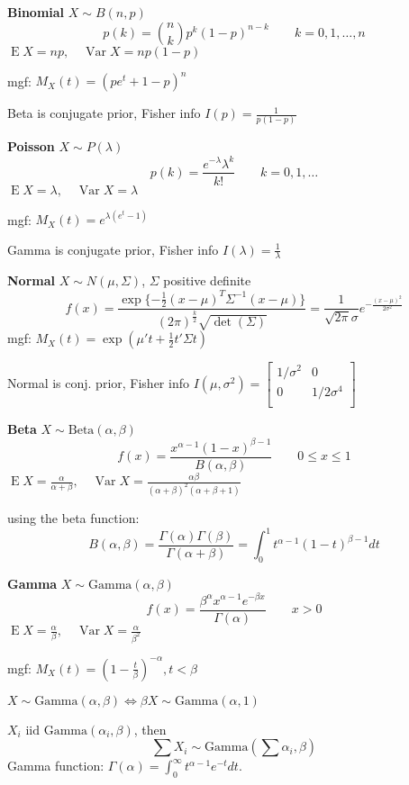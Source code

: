 \documentclass[10pt, twocolumn]{article}
\newcommand{\iid}{\text{ iid }}
\newcommand{\Expect}{\operatorname{E}}
\newcommand{\Var}{\operatorname{Var}}
\begin{document}
\textbf{Binomial}
$X \sim B(n, p)$
\[
    p(k) = \binom{n}{k} p^k (1-p)^{n-k}
    \qquad k = 0, 1, \dots, n
\]
$\Expect X = np, \quad \Var X = np(1-p)$

mgf: $M_X (t) = (pe^t + 1 - p)^n$

Beta is conjugate prior, Fisher info $I(p) = \frac{1}{p(1 - p)}$

\textbf{Poisson}
$X \sim P(\lambda)$
\[
    p(k) = \frac{e^{-\lambda} \lambda^k}{k!}
    \qquad k = 0, 1, \dots
\]
$\Expect X = \lambda, \quad \Var X = \lambda$

mgf: $M_X (t) = e^{\lambda (e^t -1)}$

Gamma is conjugate prior, Fisher info $I(\lambda) = \frac{1}{\lambda}$

\textbf{Normal}
$X \sim N(\mu, \Sigma)$, $\Sigma$ positive definite
\[
    f(x) = \frac{\exp\{ - \frac{1}{2}(x - \mu)^T \Sigma^{-1} (x - \mu) \}}
        {(2\pi)^{\frac{k}{2}} \sqrt{\det(\Sigma)}}
        = \frac{1}{\sqrt{2 \pi} \sigma} e^{-\frac{(x - \mu)^2}{2
        \sigma^2}}
\]
mgf: $M_X (t) = \exp (\mu' t + \frac{1}{2} t' \Sigma t)$

Normal is conj. prior, Fisher info $I(\mu, \sigma^2) = 
[\begin{smallmatrix}
        1 / \sigma^2 & 0 \\
        0 & 1 / 2\sigma^4 \\
\end{smallmatrix}]$

\textbf{Beta}
$ X \sim \text{Beta}(\alpha, \beta)$
\[
    f(x) = \frac{x^{\alpha-1}(1 - x)^{\beta-1}}{B(\alpha, \beta)} 
    \qquad 0 \leq x \leq 1
\]
$\Expect X = \frac{\alpha}{\alpha + \beta},
\quad \Var X = \frac{\alpha \beta}{(\alpha + \beta)^2 (\alpha + \beta + 1)}$

using the beta function:
\[
    B(\alpha, \beta) =
    \frac{\Gamma(\alpha) \Gamma(\beta)}{\Gamma(\alpha+ \beta)} =
    \int_0^1 t^{\alpha -1} (1-t)^{\beta - 1}dt
\]

\textbf{Gamma}
$X \sim \text{Gamma}(\alpha, \beta)$
\[
    f(x) = \frac{\beta^\alpha x^{\alpha-1} e^{-\beta x}}{\Gamma(\alpha)}
    \qquad x > 0
\]
$\Expect X = \frac{\alpha}{\beta},
\quad \Var X = \frac{\alpha}{\beta^2}$

mgf: $M_X (t) = (1 - \frac{t}{\beta})^{-\alpha}, t < \beta$

$X \sim \text{Gamma}(\alpha, \beta) \iff \beta X \sim \text{Gamma}(\alpha, 1)$

$X_i \iid \text{Gamma}(\alpha_i, \beta)$, then
\[
    \sum X_i \sim \text{Gamma}(\sum \alpha_i, \beta)
\]
Gamma function: $\Gamma(\alpha) = \int_0^\infty t^{\alpha-1} e^{-t} dt$.
\end{document}
